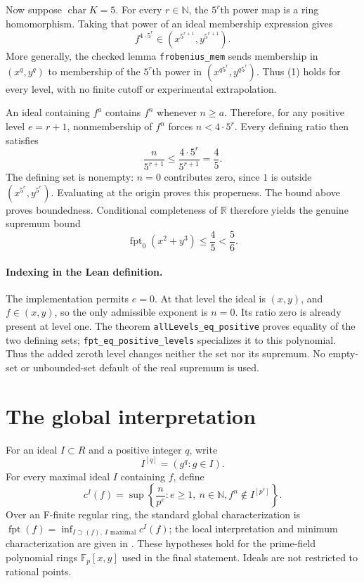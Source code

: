 \documentclass[11pt,a4paper]{article}
\newcommand{\lean}[1]{\nolinkurl{#1}}
\newcommand{\F}{\mathbb F}
\newcommand{\fpt}{\operatorname{fpt}}
\begin{document}
Now suppose $\operatorname{char}K=5$. For every $r\in\mathbb N$, the
$5^r$th power map is a ring homomorphism. Taking that power of an ideal
membership expression gives
\[
 f^{4\cdot5^r}\in
 (x^{5^{r+1}},y^{5^{r+1}}).
 \tag{1}
\]
More generally, the checked lemma \lean{frobenius_mem} sends membership
in $(x^q,y^q)$ to membership of the $5^r$th power in
$(x^{q5^r},y^{q5^r})$. Thus (1) holds for every level, with no finite
cutoff or experimental extrapolation.

An ideal containing $f^a$ contains $f^n$ whenever $n\ge a$.
Therefore, for any positive level $e=r+1$, nonmembership of $f^n$
forces $n<4\cdot5^r$. Every defining ratio then satisfies
\[
 \frac{n}{5^{r+1}}\le\frac{4\cdot5^r}{5^{r+1}}=\frac45.
\]
The defining set is nonempty: $n=0$ contributes zero, since $1$ is
outside $(x^{5^e},y^{5^e})$. Evaluating at the origin proves this
properness. The bound above proves boundedness. Conditional completeness
of $\mathbb R$ therefore yields the genuine supremum bound
\[
 \boxed{\fpt_0(x^2+y^3)\le\frac45<\frac56.}
 \tag{2}
\]

\paragraph{Indexing in the Lean definition.}
The implementation permits $e=0$. At that level the ideal is $(x,y)$,
and $f\in(x,y)$, so the only admissible exponent is $n=0$. Its ratio
zero is already present at level one. The theorem
\lean{allLevels_eq_positive} proves equality of the two defining sets;
\lean{fpt_eq_positive_levels} specializes it to this polynomial.
Thus the added zeroth level changes neither the set nor its supremum.
No empty-set or unbounded-set default of the real supremum is used.

\newpage
\section{The global interpretation}
For an ideal $I\subset R$ and a positive integer $q$, write
\[
 I^{[q]}=(g^q:g\in I).
\]
For every maximal ideal $I$ containing $f$, define
\[
 c^I(f)=\sup\left\{\frac{n}{p^e}: e\ge1,\ n\in\mathbb N,
 f^n\notin I^{[p^e]}\right\}.
\]
Over an F-finite regular ring, the standard global characterization is
$\fpt(f)=\inf_{I\supset(f),\ I\text{ maximal}}c^I(f)$;
the local interpretation and minimum characterization are given in
\cite[\S3, Proposition 3.2(iii--iv)]{bms}.
These hypotheses hold for the prime-field polynomial rings $\F_p[x,y]$
used in the final statement. Ideals are not restricted to rational points.
\end{document}
